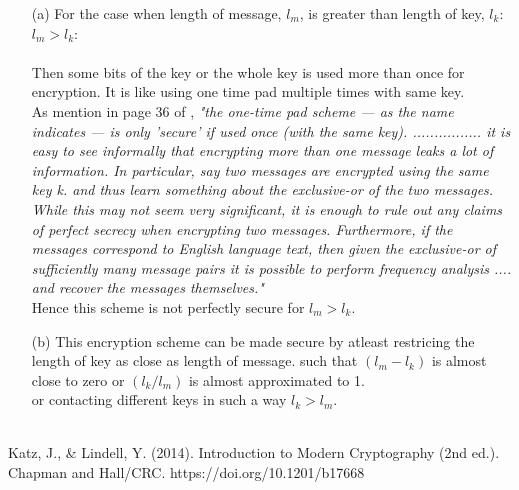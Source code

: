 \begin{itemize}
    \item[(a)]
        For the case when length of message, $l_m$, is greater than  length of key,  $l_k$: $l_m > l_k$:\\\\
        Then some bits of the key or the whole key is used more than once for encryption. It is like using
        one time pad multiple times with same key. \\
        
        As mention in page 36 of \cite{texbook}, \textit{"the one-time pad scheme — as the name indicates — is
        only 'secure' if used once (with the same key). ................ it is easy to see
        informally that encrypting more than one message leaks a lot of information.
        In particular, say two messages are encrypted using the same key k.
        and thus learn something about the exclusive-or of the two messages. While
        this may not seem very significant, it is enough to rule out any claims of perfect
        secrecy when encrypting two messages. Furthermore, if the messages correspond to
         English language text, then given the exclusive-or of sufficiently
        many message pairs it is possible to perform frequency analysis .... and recover the messages themselves."}\\

        Hence this scheme is not perfectly secure for $l_m > l_k$.\\

    \item[(b)]
        This encryption scheme can be made secure by atleast restricing the length of key as close as length of message.
        such that $ (l_m - l_k) $ is almost close to zero or $ (l_k / l_m) $ is almost approximated to 1. \\
    
        or contacting different keys in such a way $l_k > l_m$.\\\\ 
\end{itemize}

\begin{thebibliography}{9} 
    Katz, J., \& Lindell, Y. (2014). Introduction to Modern Cryptography (2nd ed.). Chapman and Hall/CRC. https://doi.org/10.1201/b17668

\end{thebibliography}


